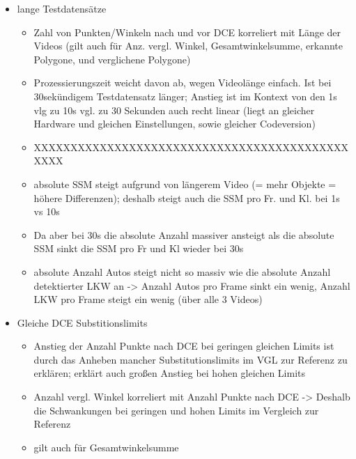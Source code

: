 {\begin{itemize}
\begin{itemize}
			\item Gesamtwinkelsumme hängt an Punktzahl nach DCE -> daher so starker Anstieg
			\item Dauer der Prozessierung sinkt, weil DCE nicht mehr so viel vereinfachen muss
			\item Ähnliche Steigerungen bei SSM, weil  absolute SSM ja auch von Punktzahl abhängt, bzw. die unteren Werte ja von absoluter SSM
			\item Absolute Anzahl Auto/LKW bleibt gleich weil 
		\end{itemize}
		\item lange Testdatensätze
		\begin{itemize}
			\item Zahl von Punkten/Winkeln nach und vor DCE korreliert mit Länge der Videos (gilt auch für Anz. vergl. Winkel, Gesamtwinkelsumme, erkannte Polygone, und verglichene Polygone)
			\item Prozessierungszeit weicht davon ab, wegen Videolänge einfach. Ist bei 30sekündigem Testdatensatz länger; Anstieg ist im Kontext von den 1s vlg zu 10s vgl. zu 30 Sekunden auch recht linear (liegt an gleicher Hardware und gleichen Einstellungen, sowie gleicher Codeversion)
			\item XXXXXXXXXXXXXXXXXXXXXXXXXXXXXXXXXXXXXXXXXXXXXXX
			\item absolute SSM steigt aufgrund von längerem Video (= mehr Objekte = höhere Differenzen); deshalb steigt auch die SSM pro Fr. und Kl. bei 1s vs 10s
			\item Da aber bei 30s die absolute Anzahl massiver ansteigt als die absolute SSM sinkt die SSM pro Fr und Kl wieder bei 30s
			\item absolute Anzahl Autos steigt nicht so massiv wie die absolute Anzahl detektierter LKW an -> Anzahl Autos pro Frame sinkt ein wenig, Anzahl LKW pro Frame steigt ein wenig (über alle 3 Videos)
		\end{itemize}
		\item Gleiche DCE Substitionslimits
		\begin{itemize}
			\item Anstieg der Anzahl Punkte nach DCE bei geringen gleichen Limits ist durch das Anheben mancher Substitutionslimits im VGL zur Referenz zu erklären; erklärt auch großen Anstieg bei hohen gleichen Limits
			\item Anzahl vergl. Winkel korreliert mit Anzahl Punkte nach DCE -> Deshalb die Schwankungen bei geringen und hohen Limits im Vergleich zur Referenz
			\item gilt auch für Gesamtwinkelsumme

\end{itemize}
\end{itemize}}
